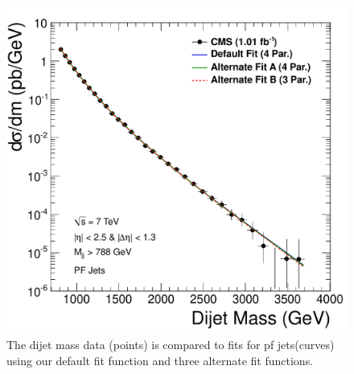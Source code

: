 \begin{figure}[!ht]
  \begin{center}
        \includegraphics[width=\textwidth]
                        {Figures/DijetMass_withFit_All_pf.pdf}
    \caption{ 
The dijet mass data (points) is compared to fits for pf jets(curves)
using our default fit function and three alternate fit functions.}
    \label{dijetmassFitParams_pf}
  \end{center}
\end{figure}


